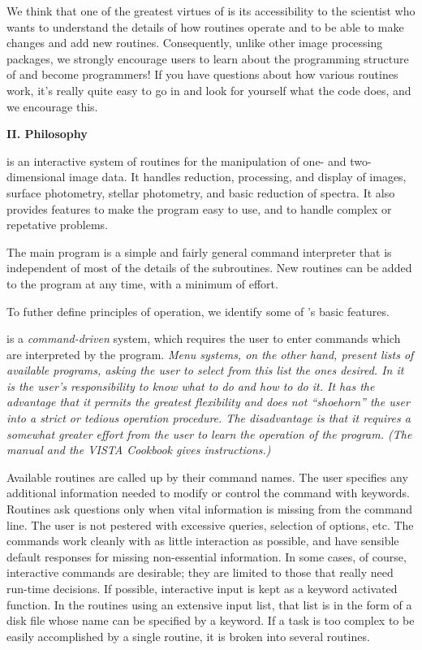 	We think that one of the greatest virtues of \V is its accessibility
to the scientist who wants to understand the details of how routines
operate and to be able to make changes and add new routines.  Consequently,
unlike other image processing packages, we strongly encourage users to
learn about the programming structure of \V and become programmers! If you
have questions about how various routines work, it's really quite easy to
go in and look for yourself what the code does, and we encourage this.

\Sskip
\centerline {\bf II. Philosophy\rm}
 	
\vskip 0.125in
	\V is an interactive system of routines for the manipulation
of one- and two-dimensional image data. It handles reduction,
processing, and display of images, surface photometry, stellar
photometry, and basic reduction of spectra. It also provides features
to make the program easy to use, and to handle complex or repetative
problems. 

	The main program is a simple and fairly general command
interpreter that is independent of most of the details of the
subroutines.  New routines
can be added to the program at any time, with a minimum of effort.

	To futher define principles of operation, we identify some of
\Vns's basic features. 

\hang
{}\V is a {\it command-driven} system,
which requires the user to enter commands which are interpreted by the
program. \it Menu systems\rm , on the other hand, present lists of
available programs, asking the user to select from this list the ones
desired. In \V it is the user's responsibility to know what to do and
how to do it. It has the
advantage that it permits the greatest flexibility and does not
``shoehorn'' the user into a strict or tedious operation procedure.
The disadvantage is that it requires a somewhat greater effort from
the user to learn the operation of the program. (The \V manual and
the \it VISTA Cookbook \rm gives instructions.) 

\noindent\hangindent 0.25in 
Available routines are called up by their command names.  The user
specifies any additional information needed to modify or control the
command with keywords. Routines ask questions only when vital
information is missing from the command line. The user is not pestered
with excessive queries, selection of options, etc. The commands work
cleanly with as little interaction as possible, and have sensible
default responses for missing non-essential information. In some
cases, of course, interactive commands are desirable; they are limited
to those that really need run-time decisions.  If possible,
interactive input is kept as a keyword activated function. In the
routines using an extensive input list, that list is in the form of a
disk file whose name can be specified by a keyword. If a task is too
complex to be easily accomplished by a single routine, it is broken
into several routines. 


